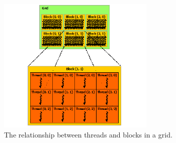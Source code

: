 \begin{figure}[ht!]
\centering
\includegraphics[width=75mm]{../gfx/blocks_and_threads.png}
\caption{The relationship between threads and blocks in a grid.}
\label{fig:thread_block}
\end{figure}

\cleardoublepage
